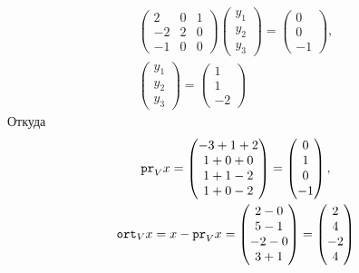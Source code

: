 \documentclass[12pt]{article}
\begin{document}
\begin{gather*}
        \begin{pmatrix}
            2  & 0 & 1 \\
            -2 & 2 & 0 \\
            -1 & 0 & 0
        \end{pmatrix}
        \begin{pmatrix}
            y_1 \\
            y_2 \\
            y_3
        \end{pmatrix}
        =
        \begin{pmatrix}
            0 \\
            0 \\
            -1
        \end{pmatrix}, \\
        \begin{pmatrix}
            y_1 \\
            y_2 \\
            y_3
        \end{pmatrix}
        =
        \begin{pmatrix}
            1 \\
            1 \\
            -2
        \end{pmatrix}
    \end{gather*}
    Откуда
    \begin{gather*}
        \texttt{pr}_{V} {x}
        =
        \begin{pmatrix}
            -3 + 1 + 2 \\
            1 + 0 + 0  \\
            1 + 1 - 2  \\
            1 + 0 - 2
        \end{pmatrix}
        =
        \begin{pmatrix}
            0 \\
            1 \\
            0 \\
            -1
        \end{pmatrix}, \\
        \texttt{ort}_{V} {x}
        = x - \texttt{pr}_{V} {x}
        =
        \begin{pmatrix}
            2 - 0  \\
            5 - 1  \\
            -2 - 0 \\
            3 + 1
        \end{pmatrix}
        =
        \begin{pmatrix}
            2  \\
            4  \\
            -2 \\
            4
        \end{pmatrix}
    \end{gather*}
\end{document}

